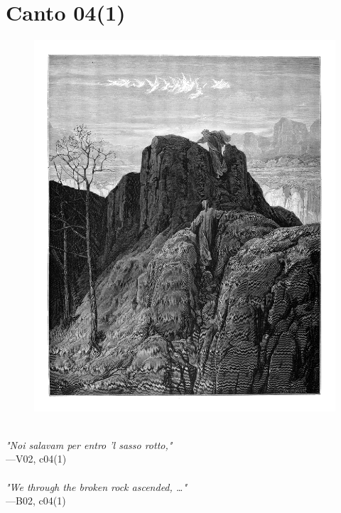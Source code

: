 \documentclass[../Dore_vision.tex]{subfiles}
\begin{document}
\newpage

\section{Canto 04(1)}

\begin{figure}[ht]
\centering
\includegraphics[height=\figsize]{illustrations/book_2/V02, c04(1).jpg}
\end{figure}

\begin{center}
\begin{minipage}{0.8\linewidth}
\textit{\\
"Noi salavam per entro ’l sasso rotto,"} \\
—V02, c04(1) \\~\\
\textit{"We through the broken rock ascended, …"} \\
—B02, c04(1)
\end{minipage}
\end{center}
\end{document}

